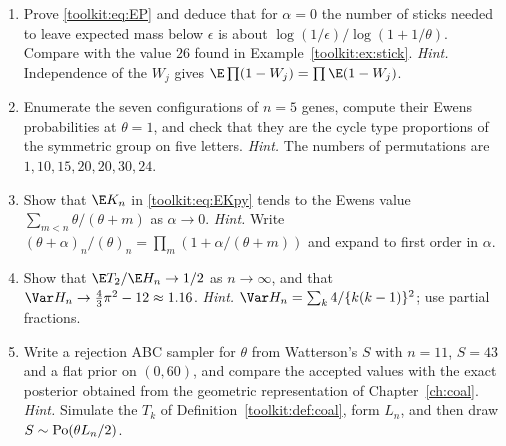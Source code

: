 \begin{enumerate}[label=\arabic*.,leftmargin=*,itemsep=4pt]
\item Prove \eqref{toolkit:eq:EP} and deduce that for $\alpha=0$ the number of sticks needed to
leave expected mass below $\epsilon$ is about $\log(1/\epsilon)/\log(1+1/\theta)$. Compare with
the value $26$ found in Example~\ref{toolkit:ex:stick}. \emph{Hint.} Independence of the $W_j$ gives
$\E\prod(1-W_j)=\prod\E(1-W_j)$.

\item Enumerate the seven configurations of $n=5$ genes, compute their Ewens probabilities at
$\theta=1$, and check that they are the cycle type proportions of the symmetric group on five
letters. \emph{Hint.} The numbers of permutations are $1,10,15,20,20,30,24$.

\item Show that $\E K_n$ in \eqref{toolkit:eq:EKpy} tends to the Ewens value
$\sum_{m<n}\theta/(\theta+m)$ as $\alpha\to0$. \emph{Hint.} Write
$(\theta+\alpha)_n/(\theta)_n=\prod_m(1+\alpha/(\theta+m))$ and expand to first order in $\alpha$.

\item Show that $\E T_2/\E H_n\to1/2$ as $n\to\infty$, and that $\Var H_n\to\tfrac43\pi^2-12
\approx1.16$. \emph{Hint.} $\Var H_n=\sum_k4/\{k(k-1)\}^2$; use partial fractions.

\item Write a rejection ABC sampler for $\theta$ from Watterson's $S$ with $n=11$, $S=43$ and a
flat prior on $(0,60)$, and compare the accepted values with the exact posterior obtained from
the geometric representation of Chapter~\ref{ch:coal}. \emph{Hint.} Simulate the $T_k$ of Definition~\ref{toolkit:def:coal}, form $L_n$, and then draw
$S\sim\mathrm{Po}(\theta L_n/2)$.
\end{enumerate}


